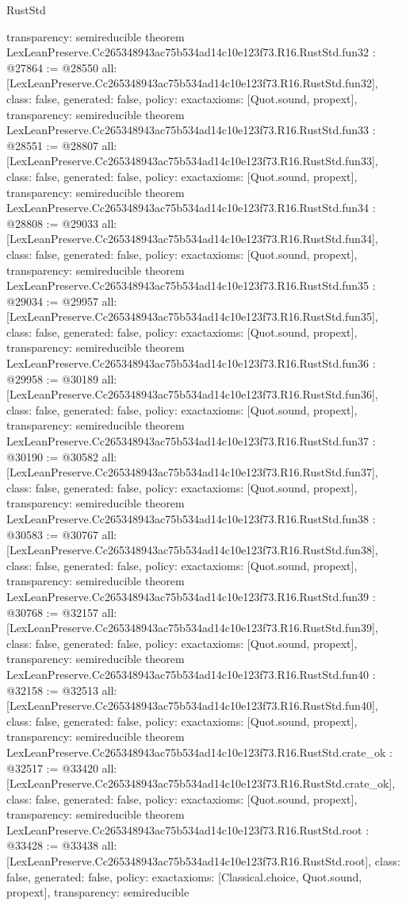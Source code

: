 \begin{lexlean}{RustStd}
\begin{coremodule}
{  transparency: semireducible
}
theorem LexLeanPreserve.Cc265348943ac75b534ad14c10e123f73.R16.RustStd.fun32 : @27864 := @28550 {
  all: [LexLeanPreserve.Cc265348943ac75b534ad14c10e123f73.R16.RustStd.fun32],
  class: false,
  generated: false,
  policy: exact{axioms: [Quot.sound, propext]},
  transparency: semireducible
}
theorem LexLeanPreserve.Cc265348943ac75b534ad14c10e123f73.R16.RustStd.fun33 : @28551 := @28807 {
  all: [LexLeanPreserve.Cc265348943ac75b534ad14c10e123f73.R16.RustStd.fun33],
  class: false,
  generated: false,
  policy: exact{axioms: [Quot.sound, propext]},
  transparency: semireducible
}
theorem LexLeanPreserve.Cc265348943ac75b534ad14c10e123f73.R16.RustStd.fun34 : @28808 := @29033 {
  all: [LexLeanPreserve.Cc265348943ac75b534ad14c10e123f73.R16.RustStd.fun34],
  class: false,
  generated: false,
  policy: exact{axioms: [Quot.sound, propext]},
  transparency: semireducible
}
theorem LexLeanPreserve.Cc265348943ac75b534ad14c10e123f73.R16.RustStd.fun35 : @29034 := @29957 {
  all: [LexLeanPreserve.Cc265348943ac75b534ad14c10e123f73.R16.RustStd.fun35],
  class: false,
  generated: false,
  policy: exact{axioms: [Quot.sound, propext]},
  transparency: semireducible
}
theorem LexLeanPreserve.Cc265348943ac75b534ad14c10e123f73.R16.RustStd.fun36 : @29958 := @30189 {
  all: [LexLeanPreserve.Cc265348943ac75b534ad14c10e123f73.R16.RustStd.fun36],
  class: false,
  generated: false,
  policy: exact{axioms: [Quot.sound, propext]},
  transparency: semireducible
}
theorem LexLeanPreserve.Cc265348943ac75b534ad14c10e123f73.R16.RustStd.fun37 : @30190 := @30582 {
  all: [LexLeanPreserve.Cc265348943ac75b534ad14c10e123f73.R16.RustStd.fun37],
  class: false,
  generated: false,
  policy: exact{axioms: [Quot.sound, propext]},
  transparency: semireducible
}
theorem LexLeanPreserve.Cc265348943ac75b534ad14c10e123f73.R16.RustStd.fun38 : @30583 := @30767 {
  all: [LexLeanPreserve.Cc265348943ac75b534ad14c10e123f73.R16.RustStd.fun38],
  class: false,
  generated: false,
  policy: exact{axioms: [Quot.sound, propext]},
  transparency: semireducible
}
theorem LexLeanPreserve.Cc265348943ac75b534ad14c10e123f73.R16.RustStd.fun39 : @30768 := @32157 {
  all: [LexLeanPreserve.Cc265348943ac75b534ad14c10e123f73.R16.RustStd.fun39],
  class: false,
  generated: false,
  policy: exact{axioms: [Quot.sound, propext]},
  transparency: semireducible
}
theorem LexLeanPreserve.Cc265348943ac75b534ad14c10e123f73.R16.RustStd.fun40 : @32158 := @32513 {
  all: [LexLeanPreserve.Cc265348943ac75b534ad14c10e123f73.R16.RustStd.fun40],
  class: false,
  generated: false,
  policy: exact{axioms: [Quot.sound, propext]},
  transparency: semireducible
}
theorem LexLeanPreserve.Cc265348943ac75b534ad14c10e123f73.R16.RustStd.crate_ok : @32517 := @33420 {
  all: [LexLeanPreserve.Cc265348943ac75b534ad14c10e123f73.R16.RustStd.crate_ok],
  class: false,
  generated: false,
  policy: exact{axioms: [Quot.sound, propext]},
  transparency: semireducible
}
theorem LexLeanPreserve.Cc265348943ac75b534ad14c10e123f73.R16.RustStd.root : @33428 := @33438 {
  all: [LexLeanPreserve.Cc265348943ac75b534ad14c10e123f73.R16.RustStd.root],
  class: false,
  generated: false,
  policy: exact{axioms: [Classical.choice, Quot.sound, propext]},
  transparency: semireducible
}


\end{coremodule}
\end{lexlean}
